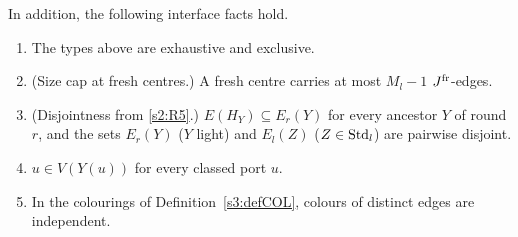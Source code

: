 \begin{lemma}
\begin{itemize}
\end{itemize}
In addition, the following interface facts hold.
\begin{enumerate}
\item[(i)] The types above are exhaustive and exclusive.
\item[(ii)] (Size cap at fresh centres.) A fresh centre carries at most $M_l-1$ $J^{\mathrm{fr}}$-edges.
\item[(iii)] (Disjointness from \ref{s2:R5}.) $E(H_Y)\subseteq E_{r}(Y)$ for every ancestor $Y$ of round $r$, and the sets $E_r(Y)$ ($Y$ light) and $E_l(Z)$ ($Z\in\mathrm{Std}_l$) are pairwise disjoint.
\item[(iv)] $u\in V(Y(u))$ for every classed port $u$.
\item[(v)] In the colourings of Definition~\ref{s3:defCOL}, colours of distinct edges are independent.
\end{enumerate}
\deps{\ref{s6:lemJSLC}, \ref{s6:lemPAR}, \ref{s6:defDesign}, \ref{s2:propStructure}, \ref{s2:lemEL}, \ref{s2:lemCap}, \ref{s3:defCOL}, \ref{s2:defHBtp}, \ref{s6:lemHCCP}, \ref{s6:defLending}}
\end{lemma}

